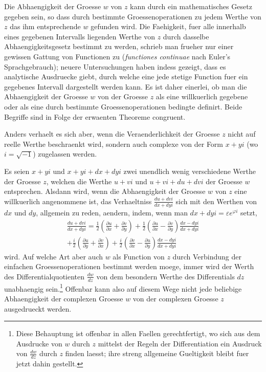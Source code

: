 \documentclass[11pt,a4paper]{article}
\theoremstyle{plain}
\theoremstyle{definition}
\begin{document}
Die Abhaengigkeit der Groesse $w$ von $z$ kann durch ein mathematisches Gesetz gegeben sein, so dass durch bestimmte Groessenoperationen zu jedem Werthe von $z$ das ihm entsprechende $w$ gefunden wird. Die Faehigkeit, fuer alle innerhalb eines gegebenen Intervalls liegenden Werthe von $z$ durch dasselbe Abhaengigkeitsgesetz bestimmt zu werden, schrieb man frueher nur einer gewissen Gattung von Functionen zu (\textit{functiones continuae} nach Euler's Sprachgebrauch); neuere Untersuchungen haben indess gezeigt, dass es analytische Ausdruecke giebt, durch welche eine jede stetige Function fuer ein gegebenes Intervall dargestellt werden kann. Es ist daher einerlei, ob man die Abhaengigkeit der Groesse $w$ von der Groesse $z$ als eine willkuerlich gegebene oder als eine durch bestimmte Groessenoperationen bedingte definirt. Beide Begriffe sind in Folge der erwaenten Theoreme congruent.

Anders verhaelt es sich aber, wenn die Veraenderlichkeit der Groesse $z$ nicht auf reelle Werthe beschraenkt wird, sondern auch complexe von der Form $x + yi$ (wo $i = \sqrt{-1}$) zugelassen werden.

Es seien $x + yi$ und $x + yi + dx + dyi$ zwei unendlich wenig verschiedene Werthe der Groesse $z$, welchen die Werthe $u + vi$ und $u + vi + du + dvi$ der Groesse $w$ entsprechen. Alsdann wird, wenn die Abhaengigkeit der Groesse $w$ von $z$ eine willkuerlich angenommene ist, das Verhaeltniss $\frac{du + dvi}{dx + dyi}$ sich mit den Werthen von $dx$ und $dy$, allgemein zu reden, aendern, indem, wenn man $dx + dyi = \varepsilon e^{\varphi i}$ setzt,
\begin{multline*}
\frac{du + dvi}{dx + dyi} = \frac{1}{2}\left(\frac{\partial u}{\partial x} + \frac{\partial v}{\partial y}\right) + \frac{1}{2}\left(\frac{\partial u}{\partial x} - \frac{\partial v}{\partial y}\right) \frac{dx - dyi}{dx + dyi} \\
+ \frac{i}{2}\left(\frac{\partial u}{\partial y} + \frac{\partial v}{\partial x}\right) + \frac{i}{2}\left(\frac{\partial v}{\partial x} - \frac{\partial u}{\partial y}\right) \frac{dx - dyi}{dx + dyi}
\end{multline*}
wird. Auf welche Art aber auch $w$ als Function von $z$ durch Verbindung der einfachen Groessenoperationen bestimmt werden moege, immer wird der Werth des Differentialquotienten $\frac{dw}{dz}$ von dem besondern Werthe des Differentials $dz$ unabhaengig sein.\footnote{Diese Behauptung ist offenbar in allen Faellen gerechtfertigt, wo sich aus dem Ausdrucke von $w$ durch $z$ mittelst der Regeln der Differentiation ein Ausdruck von $\frac{dw}{dz}$ durch $z$ finden laesst; ihre streng allgemeine Gueltigkeit bleibt fuer jetzt dahin gestellt.} Offenbar kann also auf diesem Wege nicht jede beliebige Abhaengigkeit der complexen Groesse $w$ von der complexen Groesse $z$ ausgedrueckt werden.
\end{document}
